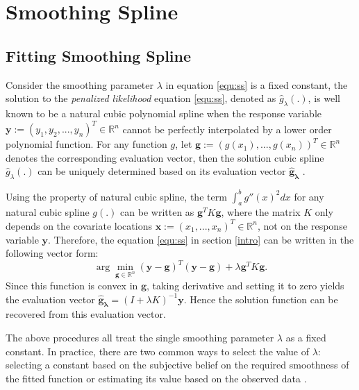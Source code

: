 \documentclass{article}
\begin{document}
\section{Smoothing Spline}\label{SmoothSpline}

\subsection{Fitting Smoothing Spline}

Consider the smoothing parameter $\lambda$ in equation \ref{equ:ss} is a fixed constant, the solution to the \textit{penalized likelihood} equation \ref{equ:ss}, denoted as $\hat{g}_\lambda(.)$, is well known to be a natural cubic polynomial spline when the response variable $\boldsymbol{y}:= (y_1, y_2, ..., y_n)^T \in \mathbb{R}^n$ cannot be perfectly interpolated by a lower order polynomial function. For any function $g$, let $\boldsymbol{g} := (g(x_1), ..., g(x_n))^T \in \mathbb{R}^n$ denotes the corresponding evaluation vector, then the solution cubic spline $\hat{g}_\lambda(.)$ can be uniquely determined based on its evaluation vector $\boldsymbol{\hat{g}_\lambda}$ \citep{smoothingspline}. 



Using the property of natural cubic spline, the term $\int_a^b g''(x)^2 dx$ for any natural cubic spline $g(.)$ can be written as $\boldsymbol{g}^T K \boldsymbol{g}$, where the matrix $K$ only depends on the covariate locations $\boldsymbol{x} := (x_1, ..., x_n)^T \in \mathbb{R}^n$, not on the response variable $\boldsymbol{y}$. Therefore, the equation \ref{equ:ss} in section \ref{intro} can be written in the following vector form:
\begin{equation}\label{equ:vectorss}
\arg\min_{\boldsymbol{g}\in \mathbb{R}^n}(\boldsymbol{y} - \boldsymbol{g})^T (\boldsymbol{y} - \boldsymbol{g}) + \lambda \boldsymbol{g}^T K \boldsymbol{g}.
\end{equation}
Since this function is convex in $\boldsymbol{g}$, taking derivative and setting it to zero yields the evaluation vector $\boldsymbol{\hat{g}_\lambda} = (I+\lambda K)^{-1} \boldsymbol{y}$. Hence the solution function can be recovered from this evaluation vector. 

The above procedures all treat the single smoothing parameter $\lambda$ as a fixed constant. In practice, there are two common ways to select the value of $\lambda$: selecting a constant based on the subjective belief on the required smoothness of the fitted function or estimating its value based on the observed data \citep{smoothingspline}. 
\end{document}
